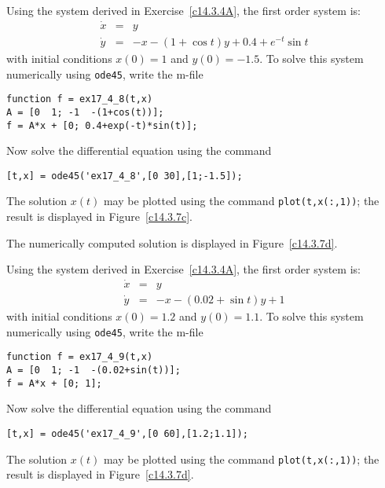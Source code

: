 \documentclass{ximera}
\begin{document}
\soln  Using the system  derived in 
Exercise~\ref{c14.3.4A}, the first order system is:
\begin{eqnarray*}
\dot{x} & = & y \\
\dot{y} & = & -x - (1+\cos t)y + 0.4 + e^{-t}\sin t
\end{eqnarray*}
with initial conditions $x(0)=1$ and $y(0)=-1.5$. To solve this system numerically 
using {\tt ode45}, write the m-file
\begin{verbatim}
function f = ex17_4_8(t,x)
A = [0  1; -1  -(1+cos(t))];
f = A*x + [0; 0.4+exp(-t)*sin(t)];
\end{verbatim}
Now solve the differential equation using the command
\begin{verbatim}
[t,x] = ode45('ex17_4_8',[0 30],[1;-1.5]);
\end{verbatim}
The solution $x(t)$ may be plotted using the command {\tt plot(t,x(:,1))}; the 
result is displayed in Figure~\ref{c14.3.7c}.
\begin{figure}[htb]
     \centerline{%
     }
\end{figure} 



 \ans The numerically computed solution is displayed in 
Figure~\ref{c14.3.7d}.

\soln  Using the system  derived in 
Exercise~\ref{c14.3.4A}, the first order system is:
\begin{eqnarray*}
\dot{x} & = & y \\
\dot{y} & = & -x - (0.02+\sin t)y + 1
\end{eqnarray*}
with initial conditions $x(0)=1.2$ and $y(0)=1.1$.   To solve this system numerically 
using {\tt ode45}, write the m-file
\begin{verbatim}
function f = ex17_4_9(t,x)
A = [0  1; -1  -(0.02+sin(t))];
f = A*x + [0; 1];
\end{verbatim}
Now solve the differential equation using the command
\begin{verbatim}
[t,x] = ode45('ex17_4_9',[0 60],[1.2;1.1]);
\end{verbatim}
The solution $x(t)$ may be plotted using the command {\tt plot(t,x(:,1))}; the 
result is displayed in Figure~\ref{c14.3.7d}.
\begin{figure}[htb]
     \centerline{%
     }
\end{figure} 
\end{document}
